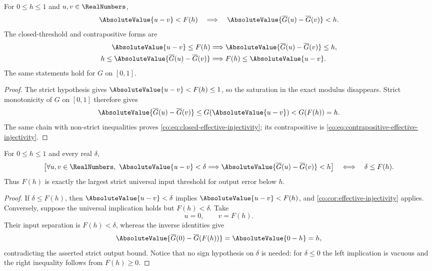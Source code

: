 \begin{corollary}\label{co:cor:effective-injectivity}
For $0\le h\le1$ and $u,v\in\RealNumbers$,
\begin{equation}\label{co:eq:effective-injectivity}
 \AbsoluteValue{u-v}<F(h)
 \quad\Longrightarrow\quad
 \AbsoluteValue{\InvT(u)-\InvT(v)}<h.
\end{equation}
The closed-threshold and contrapositive forms are
\begin{align}
 \AbsoluteValue{u-v}\le F(h)
 &\Longrightarrow \AbsoluteValue{\InvT(u)-\InvT(v)}\le h,
 \label{co:eq:closed-effective-injectivity}\\
 h\le\AbsoluteValue{\InvT(u)-\InvT(v)}
 &\Longrightarrow F(h)\le\AbsoluteValue{u-v}.
 \label{co:eq:contrapositive-effective-injectivity}
\end{align}
The same statements hold for $G$ on $[0,1]$.
\end{corollary}

\begin{proof}
The strict hypothesis gives
$\AbsoluteValue{u-v}<F(h)\le1$, so the saturation in the exact modulus disappears.
Strict monotonicity of $G$ on $[0,1]$ therefore gives
\[
 \AbsoluteValue{\InvT(u)-\InvT(v)}
 \le G(\AbsoluteValue{u-v})<G(F(h))=h.
\]
The same chain with non-strict inequalities proves
\eqref{co:eq:closed-effective-injectivity}; its contrapositive is
\eqref{co:eq:contrapositive-effective-injectivity}.
\end{proof}

\begin{theorem}\label{co:thm:exact-strict-threshold}
For $0\le h\le1$ and every real $\delta$,
\begin{equation}\label{co:eq:exact-strict-threshold}
 \left[
   \forall u,v\in\RealNumbers,
   \ \AbsoluteValue{u-v}<\delta
   \Longrightarrow
   \AbsoluteValue{\InvT(u)-\InvT(v)}<h
 \right]
 \quad\Longleftrightarrow\quad
 \delta\le F(h).
\end{equation}
Thus $F(h)$ is exactly the largest strict universal input threshold for output
error below $h$.
\end{theorem}

\begin{proof}
If $\delta\le F(h)$, then
$\AbsoluteValue{u-v}<\delta$ implies $\AbsoluteValue{u-v}<F(h)$, and
\cref{co:cor:effective-injectivity} applies.  Conversely, suppose the universal
implication holds but $F(h)<\delta$.  Take
\[
 u=0,\qquad v=F(h).
\]
Their input separation is $F(h)<\delta$, whereas the inverse identities give
\[
 \AbsoluteValue{\InvT(0)-\InvT(F(h))}=\AbsoluteValue{0-h}=h,
\]
contradicting the asserted strict output bound.  Notice that no sign
hypothesis on $\delta$ is needed: for $\delta\le0$ the left implication is
vacuous and the right inequality follows from $F(h)\ge0$.
\end{proof}

